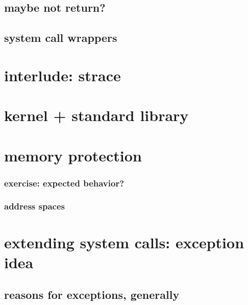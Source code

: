 \subsection{maybe not return?}



\subsection{system call wrappers}

% 

\section{interlude: strace}


\section{kernel + standard library}

\section{memory protection}

\subsubsection{exercise: expected behavior?}


%

\subsubsection{address spaces}


\section{extending system calls: exception idea}


\subsection{reasons for exceptions, generally}


